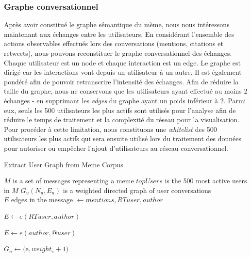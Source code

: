 \subsubsection[Graphe conversationnel]{Graphe conversationnel}

    Après avoir constitué le graphe sémantique du mème, nous  nous intéressons maintenant aux échanges entre les utilisateurs. En considérant l'ensemble des actions observables  effectués lors des conversations (mentions, citations et retweets), nous pouvons reconstituer le graphe conversationnel des échanges. Chaque  utilisateur est un node et chaque interaction est un edge. Le graphe est dirigé car les interactions vont depuis un utilisateur à un autre. Il est également pondéré afin de pouvoir retranscrire l'intensité des échanges. Afin de réduire la taille du graphe, nous ne conservons que les utilisateurs ayant effectué au moins 2 échanges - en supprimant les \textit{edges} du graphe ayant un poids inférieur à 2. Parmi eux, seuls les 500 utilisateurs les plus actifs sont utilisés pour l'analyse afin de réduire le temps de traitement et la complexité du réseau pour la visualisation. Pour procéder à cette limitation, nous constituons une \textit{whitelist} des 500 utilisateurs les plus actifs qui sera ensuite utilisé lors du traitement des données pour autoriser ou empêcher l'ajout d'utilisateurs au réseau conversationnel.

    \begin{algorithm}[h]
        \caption{Extract User Graph from Meme Corpus}
        \label{algo:meme-user-graph}
        \begin{algorithmic}
            \Require $M$ is a set of messages representing a meme
            \State $topUsers$ is the 500 most active users in $M$
            \State $G_u(N_u,E_u)$ is a weighted directed graph of user conversations
            \\
                    \State $E$ edges in the message
                    \State {}  $ \gets mentions, RTuser, author$
                    

                            \State $E \gets e(RTuser, author)$    
                        \EndIf

                            \State $E \gets e(author, @user)$    
                        \EndFor
                        
                            \State $G_u \gets ($e$,weight_e+1)$
                        \EndFor

                    \EndIf

                \EndFor
            \EndFunction
        \end{algorithmic}
    \end{algorithm}

